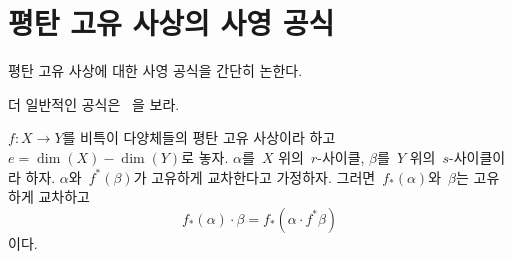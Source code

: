 \section{평탄 고유 사상의 사영 공식}
\label{section-projection-formula-flat}

\noindent
평탄 고유 사상에 대한 사영 공식을 간단히 논한다.

\begin{lemma}
\label{lemma-projection-formula-flat}
\begin{reference}
더 일반적인 공식은\  \cite[Chapter V, C), Section 7, formula (10)]{Serre_algebre_locale}
을 보라.
\end{reference}
$f : X \to Y$를 비특이 다양체들의 평탄 고유 사상이라 하고\ 
$e = \dim(X) - \dim(Y)$로 놓자. $\alpha$를\  $X$ 위의\  $r$-사이클,
$\beta$를\  $Y$ 위의\  $s$-사이클이라 하자. $\alpha$와\  $f^*(\beta)$가
고유하게 교차한다고 가정하자. 그러면\  $f_*(\alpha)$와\  $\beta$는 고유하게
교차하고
$$
f_*(\alpha) \cdot \beta = f_*( \alpha \cdot f^*\beta)
$$
이다.
\end{lemma}

